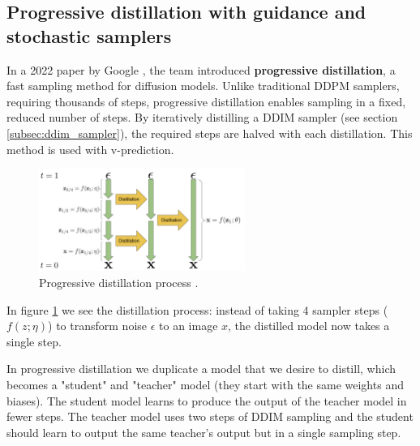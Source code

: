 \subsection{Progressive distillation with guidance and stochastic samplers}

In a 2022 paper by Google \cite{v_prediction}, the team introduced \textbf{progressive distillation}, a fast sampling method for diffusion models. Unlike traditional DDPM samplers, requiring thousands of steps, progressive distillation enables sampling in a fixed, reduced number of steps. By iteratively distilling a DDIM sampler (see section \ref{subsec:ddim_sampler}), the required steps are halved with each distillation. This method is used with v-prediction.

\begin{figure}
    \centering
    \includegraphics[width=0.6\textwidth]{images/imagen_video/v_prediction.png}
    \caption{Progressive distillation process \cite{v_prediction}.}
    \label{fig:progressive_distillation}
\end{figure}

In figure \ref{fig:progressive_distillation} we see the distillation process: instead of taking 4 sampler steps ($f(z; \eta)$) to transform noise $\epsilon$ to an image $x$, the distilled model now takes a single step.

In progressive distillation we duplicate a model that we desire to distill, which becomes a "student" and "teacher" model (they start with the same weights and biases). The student model learns to produce the output of the teacher model in fewer steps. The teacher model uses two steps of DDIM sampling and the student should learn to output the same teacher's output but in a single sampling step.




